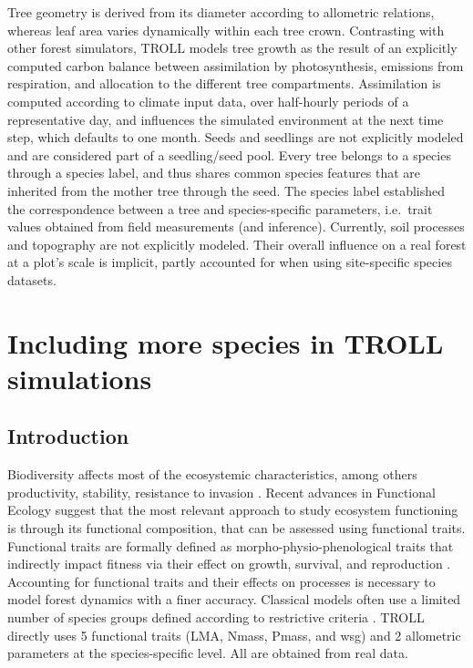 \documentclass[12pt,]{article}
\let\oldsection\section
\renewcommand\section{\newpage\oldsection}
\theoremstyle{definition}
\theoremstyle{definition}
\theoremstyle{definition}
\theoremstyle{remark}
\begin{document}
Tree geometry is derived from its diameter according to allometric
relations, whereas leaf area varies dynamically within each tree crown.
Contrasting with other forest simulators, TROLL models tree growth as
the result of an explicitly computed carbon balance between assimilation
by photosynthesis, emissions from respiration, and allocation to the
different tree compartments. Assimilation is computed according to
climate input data, over half-hourly periods of a representative day,
and influences the simulated environment at the next time step, which
defaults to one month. Seeds and seedlings are not explicitly modeled
and are considered part of a seedling/seed pool. Every tree belongs to a
species through a species label, and thus shares common species features
that are inherited from the mother tree through the seed. The species
label established the correspondence between a tree and species-specific
parameters, i.e.~trait values obtained from field measurements (and
inference). Currently, soil processes and topography are not explicitly
modeled. Their overall influence on a real forest at a plot's scale is
implicit, partly accounted for when using site-specific species
datasets.

\section{Including more species in TROLL
simulations}\label{including-more-species-in-troll-simulations}

\subsection{Introduction}\label{introduction-1}

Biodiversity affects most of the ecosystemic characteristics, among
others productivity, stability, resistance to invasion
\citep{Lyons2001, Huston2001}. Recent advances in Functional Ecology
suggest that the most relevant approach to study ecosystem functioning
is through its functional composition, that can be assessed using
functional traits. Functional traits are formally defined as
morpho-physio-phenological traits that indirectly impact fitness via
their effect on growth, survival, and reproduction \citep{Violle2007}.
Accounting for functional traits and their effects on processes is
necessary to model forest dynamics with a finer accuracy. Classical
models often use a limited number of species groups defined according to
restrictive criteria \citep{Marechaux2017a}. TROLL directly uses 5
functional traits (LMA, Nmass, Pmass, and wsg) and 2 allometric
parameters at the species-specific level. All are obtained from real
data.
\end{document}
